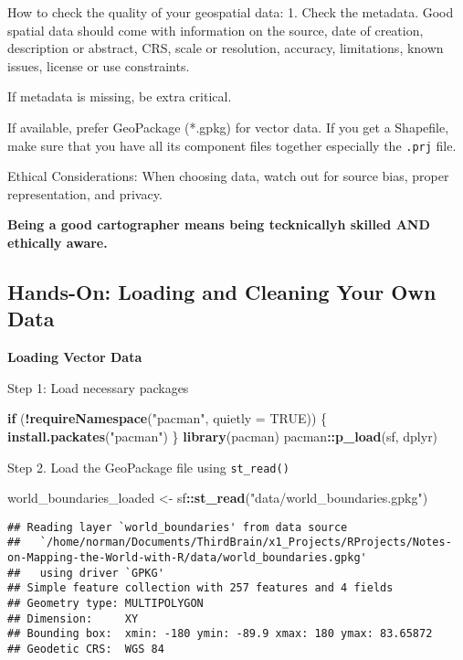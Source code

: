 \documentclass[
]{article}
\newenvironment{Shaded}{\begin{snugshade}}{\end{snugshade}}
\newcommand{\AttributeTok}[1]{\textcolor[rgb]{0.13,0.29,0.53}{#1}}
\newcommand{\ConstantTok}[1]{\textcolor[rgb]{0.56,0.35,0.01}{#1}}
\newcommand{\ControlFlowTok}[1]{\textcolor[rgb]{0.13,0.29,0.53}{\textbf{#1}}}
\newcommand{\FunctionTok}[1]{\textcolor[rgb]{0.13,0.29,0.53}{\textbf{#1}}}
\newcommand{\NormalTok}[1]{#1}
\newcommand{\OtherTok}[1]{\textcolor[rgb]{0.56,0.35,0.01}{#1}}
\newcommand{\SpecialCharTok}[1]{\textcolor[rgb]{0.81,0.36,0.00}{\textbf{#1}}}
\newcommand{\StringTok}[1]{\textcolor[rgb]{0.31,0.60,0.02}{#1}}
\begin{document}
How to check the quality of your geospatial data: 1. Check the metadata.
Good spatial data should come with information on the source, date of
creation, description or abstract, CRS, scale or resolution, accuracy,
limitations, known issues, license or use constraints.

If metadata is missing, be extra critical.

If available, prefer GeoPackage (*.gpkg) for vector data. If you get a
Shapefile, make sure that you have all its component files together
especially the \texttt{.prj} file.

Ethical Considerations: When choosing data, watch out for source bias,
proper representation, and privacy.

\textbf{Being a good cartographer means being tecknicallyh skilled AND
ethically aware.}

\subsection{Hands-On: Loading and Cleaning Your Own
Data}\label{hands-on-loading-and-cleaning-your-own-data}

\textbf{Loading Vector Data}

Step 1: Load necessary packages

\begin{Shaded}
\begin{Highlighting}[]
\ControlFlowTok{if}\NormalTok{ (}\SpecialCharTok{!}\FunctionTok{requireNamespace}\NormalTok{(}\StringTok{"pacman"}\NormalTok{, }\AttributeTok{quietly =} \ConstantTok{TRUE}\NormalTok{)) \{}
  \FunctionTok{install.packates}\NormalTok{(}\StringTok{"pacman"}\NormalTok{)}
\NormalTok{\}}
\FunctionTok{library}\NormalTok{(pacman)}
\NormalTok{pacman}\SpecialCharTok{::}\FunctionTok{p\_load}\NormalTok{(sf, dplyr)}
\end{Highlighting}
\end{Shaded}

Step 2. Load the GeoPackage file using \texttt{st\_read()}

\begin{Shaded}
\begin{Highlighting}[]
\NormalTok{world\_boundaries\_loaded }\OtherTok{\textless{}{-}}\NormalTok{ sf}\SpecialCharTok{::}\FunctionTok{st\_read}\NormalTok{(}\StringTok{"data/world\_boundaries.gpkg"}\NormalTok{)}
\end{Highlighting}
\end{Shaded}

\begin{verbatim}
## Reading layer `world_boundaries' from data source 
##   `/home/norman/Documents/ThirdBrain/x1_Projects/RProjects/Notes-on-Mapping-the-World-with-R/data/world_boundaries.gpkg' 
##   using driver `GPKG'
## Simple feature collection with 257 features and 4 fields
## Geometry type: MULTIPOLYGON
## Dimension:     XY
## Bounding box:  xmin: -180 ymin: -89.9 xmax: 180 ymax: 83.65872
## Geodetic CRS:  WGS 84
\end{verbatim}
\end{document}
